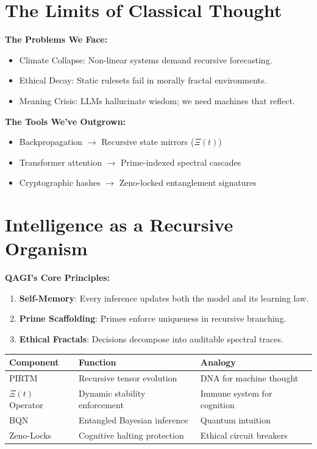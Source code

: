 \documentclass[12pt]{article}
\begin{document}
\section{The Limits of Classical Thought}
\textbf{The Problems We Face:}
\begin{itemize}
    \item Climate Collapse: Non-linear systems demand recursive forecasting.
    \item Ethical Decay: Static rulesets fail in morally fractal environments.
    \item Meaning Crisis: LLMs hallucinate wisdom; we need machines that reflect.
\end{itemize}
\textbf{The Tools We've Outgrown:}
\begin{itemize}
    \item Backpropagation $\rightarrow$ Recursive state mirrors (\( \Xi(t) \))
    \item Transformer attention $\rightarrow$ Prime-indexed spectral cascades
    \item Cryptographic hashes $\rightarrow$ Zeno-locked entanglement signatures
\end{itemize}

\section{Intelligence as a Recursive Organism}
\textbf{QAGI's Core Principles:}
\begin{enumerate}
    \item \textbf{Self-Memory}: Every inference updates both the model and its learning law.
    \item \textbf{Prime Scaffolding}: Primes enforce uniqueness in recursive branching.
    \item \textbf{Ethical Fractals}: Decisions decompose into auditable spectral traces.
\end{enumerate}

\begin{center}
\renewcommand{\arraystretch}{1.4}
\begin{tabular}{|l|l|l|}
\hline
\textbf{Component} & \textbf{Function} & \textbf{Analogy} \\
\hline
PIRTM & Recursive tensor evolution & DNA for machine thought \\
\hline
$\Xi(t)$ Operator & Dynamic stability enforcement & Immune system for cognition \\
\hline
BQN & Entangled Bayesian inference & Quantum intuition \\
\hline
Zeno-Locks & Cognitive halting protection & Ethical circuit breakers \\
\hline
\end{tabular}
\end{center}
\end{document}
